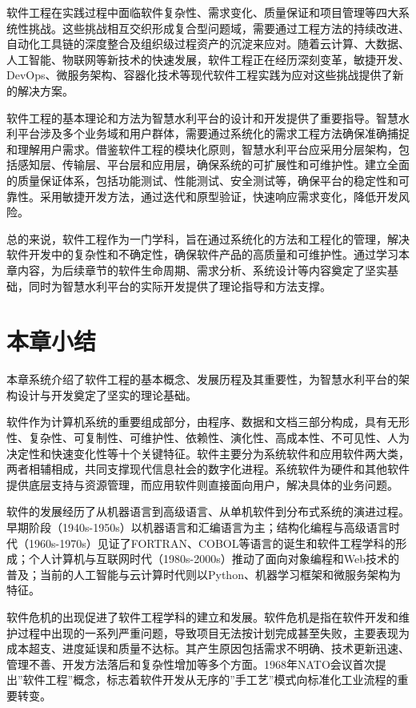 \documentclass[12pt,a4paper]{ctexbook}
\begin{document}
软件工程在实践过程中面临软件复杂性、需求变化、质量保证和项目管理等四大系统性挑战。这些挑战相互交织形成复合型问题域，需要通过工程方法的持续改进、自动化工具链的深度整合及组织级过程资产的沉淀来应对。随着云计算、大数据、人工智能、物联网等新技术的快速发展，软件工程正在经历深刻变革，敏捷开发、DevOps、微服务架构、容器化技术等现代软件工程实践为应对这些挑战提供了新的解决方案。

软件工程的基本理论和方法为智慧水利平台的设计和开发提供了重要指导。智慧水利平台涉及多个业务域和用户群体，需要通过系统化的需求工程方法确保准确捕捉和理解用户需求。借鉴软件工程的模块化原则，智慧水利平台应采用分层架构，包括感知层、传输层、平台层和应用层，确保系统的可扩展性和可维护性。建立全面的质量保证体系，包括功能测试、性能测试、安全测试等，确保平台的稳定性和可靠性。采用敏捷开发方法，通过迭代和原型验证，快速响应需求变化，降低开发风险。

总的来说，软件工程作为一门学科，旨在通过系统化的方法和工程化的管理，解决软件开发中的复杂性和不确定性，确保软件产品的高质量和可维护性。通过学习本章内容，为后续章节的软件生命周期、需求分析、系统设计等内容奠定了坚实基础，同时为智慧水利平台的实际开发提供了理论指导和方法支撑。

\section{本章小结}\label{ux672cux7ae0ux5c0fux7ed3}

本章系统介绍了软件工程的基本概念、发展历程及其重要性，为智慧水利平台的架构设计与开发奠定了坚实的理论基础。

软件作为计算机系统的重要组成部分，由程序、数据和文档三部分构成，具有无形性、复杂性、可复制性、可维护性、依赖性、演化性、高成本性、不可见性、人为决定性和快速变化性等十个关键特征。软件主要分为系统软件和应用软件两大类，两者相辅相成，共同支撑现代信息社会的数字化进程。系统软件为硬件和其他软件提供底层支持与资源管理，而应用软件则直接面向用户，解决具体的业务问题。

软件的发展经历了从机器语言到高级语言、从单机软件到分布式系统的演进过程。早期阶段（1940s-1950s）以机器语言和汇编语言为主；结构化编程与高级语言时代（1960s-1970s）见证了FORTRAN、COBOL等语言的诞生和软件工程学科的形成；个人计算机与互联网时代（1980s-2000s）推动了面向对象编程和Web技术的普及；当前的人工智能与云计算时代则以Python、机器学习框架和微服务架构为特征。

软件危机的出现促进了软件工程学科的建立和发展。软件危机是指在软件开发和维护过程中出现的一系列严重问题，导致项目无法按计划完成甚至失败，主要表现为成本超支、进度延误和质量不达标。其产生原因包括需求不明确、技术更新迅速、管理不善、开发方法落后和复杂性增加等多个方面。1968年NATO会议首次提出''软件工程''概念，标志着软件开发从无序的''手工艺''模式向标准化工业流程的重要转变。
\end{document}
